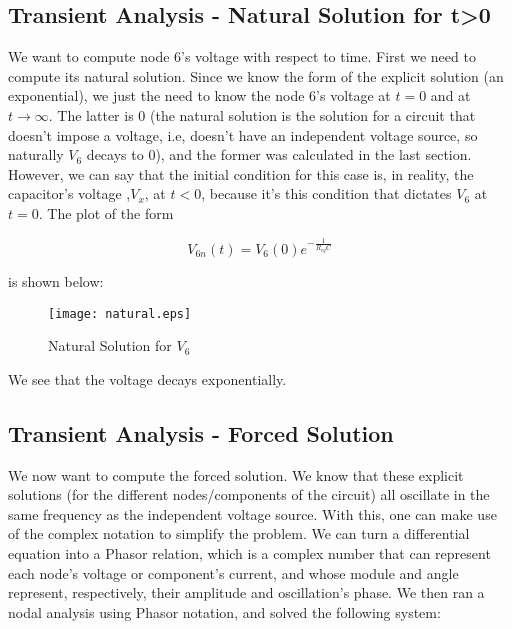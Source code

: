 \subsection{ Transient Analysis - Natural Solution for t>0}
We want to compute node 6's voltage with respect to time. First we need to compute its natural solution. Since we know the form of the explicit solution  (an exponential), we just the need to know the node 6's voltage at $t=0$ and at $t \to \infty $.
The latter is $0$ (the natural solution is the solution for a circuit that doesn't impose a voltage, i.e, doesn't have an independent voltage source, so naturally $V_{6}$ decays to $0$), and the former was calculated in the last section. However, we can say that
the initial condition for this case is, in reality, the capacitor's voltage ,$V_x$, at $t<0$, because it's this condition that dictates $V_6$ at $t=0$. The plot of the form


\begin{center}
\begin{equation}
V_{6n}(t)=V_6(0) e^{-\frac{1}{R_{eq}C}}
\label{ExplicitNaturalSolution}
\end{equation}
\end{center}
is shown below:

\begin{figure}[H]
  \centering
  \texttt{[image: natural.eps]}
  \caption{Natural Solution for $V_{6}$}
  \label{fig:OctaveNaturalSolution}
\end{figure}

We see that the voltage decays exponentially.
\subsection{Transient Analysis - Forced Solution}
We now want to compute the forced solution. We know that these explicit solutions (for the different nodes/components of the circuit) all oscillate in the same frequency as the independent voltage source. With this, one can make use of the complex notation to
simplify the problem. We can turn a differential equation into a Phasor relation, which is a complex number that can represent each node's voltage or component's current, and whose module and angle represent, respectively, their amplitude and oscillation's phase.
We then ran a nodal analysis using Phasor notation, and solved the following system:

